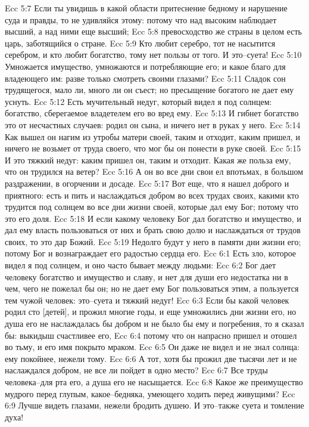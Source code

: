 Ecc 5:7  Если ты увидишь в какой области притеснение бедному и нарушение суда и правды, то не удивляйся этому: потому что над высоким наблюдает высший, а над ними еще высший;
Ecc 5:8  превосходство же страны в целом есть царь, заботящийся о стране.
Ecc 5:9  Кто любит серебро, тот не насытится серебром, и кто любит богатство, тому нет пользы от того. И это--суета!
Ecc 5:10  Умножается имущество, умножаются и потребляющие его; и какое благо для владеющего им: разве только смотреть своими глазами?
Ecc 5:11  Сладок сон трудящегося, мало ли, много ли он съест; но пресыщение богатого не дает ему уснуть.
Ecc 5:12  Есть мучительный недуг, который видел я под солнцем: богатство, сберегаемое владетелем его во вред ему.
Ecc 5:13  И гибнет богатство это от несчастных случаев: родил он сына, и ничего нет в руках у него.
Ecc 5:14  Как вышел он нагим из утробы матери своей, таким и отходит, каким пришел, и ничего не возьмет от труда своего, что мог бы он понести в руке своей.
Ecc 5:15  И это тяжкий недуг: каким пришел он, таким и отходит. Какая же польза ему, что он трудился на ветер?
Ecc 5:16  А он во все дни свои ел впотьмах, в большом раздражении, в огорчении и досаде.
Ecc 5:17  Вот еще, что я нашел доброго и приятного: есть и пить и наслаждаться добром во всех трудах своих, какими кто трудится под солнцем во все дни жизни своей, которые дал ему Бог; потому что это его доля.
Ecc 5:18  И если какому человеку Бог дал богатство и имущество, и дал ему власть пользоваться от них и брать свою долю и наслаждаться от трудов своих, то это дар Божий.
Ecc 5:19  Недолго будут у него в памяти дни жизни его; потому Бог и вознаграждает его радостью сердца его.
Ecc 6:1  Есть зло, которое видел я под солнцем, и оно часто бывает между людьми:
Ecc 6:2  Бог дает человеку богатство и имущество и славу, и нет для души его недостатка ни в чем, чего не пожелал бы он; но не дает ему Бог пользоваться этим, а пользуется тем чужой человек: это--суета и тяжкий недуг!
Ecc 6:3  Если бы какой человек родил сто [детей], и прожил многие годы, и еще умножились дни жизни его, но душа его не наслаждалась бы добром и не было бы ему и погребения, то я сказал бы: выкидыш счастливее его,
Ecc 6:4  потому что он напрасно пришел и отошел во тьму, и его имя покрыто мраком.
Ecc 6:5  Он даже не видел и не знал солнца: ему покойнее, нежели тому.
Ecc 6:6  А тот, хотя бы прожил две тысячи лет и не наслаждался добром, не все ли пойдет в одно место?
Ecc 6:7  Все труды человека--для рта его, а душа его не насыщается.
Ecc 6:8  Какое же преимущество мудрого перед глупым, какое--бедняка, умеющего ходить перед живущими?
Ecc 6:9  Лучше видеть глазами, нежели бродить душею. И это--также суета и томление духа!
